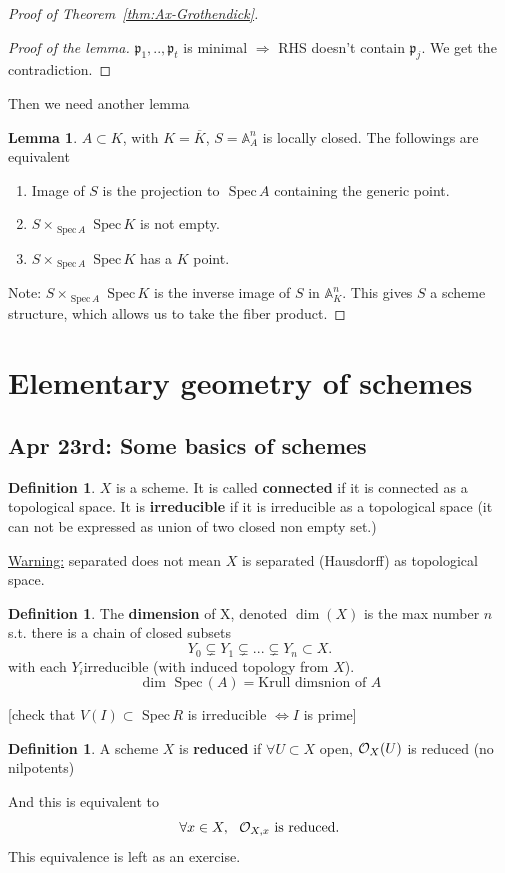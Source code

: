 \documentclass[11pt]{article}
\theoremstyle{definition}
\newtheorem{lemma}[thm]{Lemma}
\newtheorem{dfn}[thm]{Definition}
\newcommand{\spec}{\text{ Spec}\,}
\newcommand{\affn}{\mathbb A}
\newcommand{\scp}{{\mathfrak p}}
\newcommand{\calo}{{\cal O}}
\newcommand{\Lrta}{\Longrightarrow}
\newcommand{\Llrta}{\Longleftrightarrow}
\begin{document}
\begin{proof}[Proof of Theorem~\ref{thm:Ax-Grothendick}]
\begin{proof}[Proof of the lemma]
$\scp_1,..,\scp_t$ is minimal $\Lrta $ RHS doesn't contain $\scp_j$. We get the contradiction.
\end{proof}

Then we need another lemma
\begin{lemma}


$A\subset K$, with $ K=\overline{K}$, $S=\affn^n_A$ is locally closed. The followings are equivalent
\begin{enumerate}[label=(\arabic*)]
\item Image of $S$ is the projection to $\spec A$ containing the generic point.
\item $S\times_{\spec A}\spec K$ is not empty.
\item $S\times_{\spec A}\spec K$ has a $K$ point. 
\end{enumerate}
\end{lemma}

Note: $S\times_{\spec A}\spec K$ is the inverse image of $S$ in $\affn^n_K$. This gives  $S$ a scheme structure, which allows us to take the fiber product.
\end{proof}
\section{Elementary geometry of schemes}
\subsection{Apr 23rd: Some basics of schemes}
\begin{dfn}
$X$ is a scheme. It is called \textbf{connected} if it is connected as a topological space. It is \textbf{irreducible} if it is irreducible as a topological space (it can not be expressed as union of two closed non empty set.)
\end{dfn}
\underline{Warning:} separated does not mean $X$ is separated (Hausdorff) as topological space.

\begin{dfn}
The \textbf{dimension} of X, denoted $\dim(X)$ is the max number $n$ s.t. there is a chain of closed subsets
$$
Y_0\subsetneq Y_1\subsetneq ...\subsetneq Y_n \subset X.
$$ with each $Y_i$irreducible (with induced topology from $X$).
$$
\dim \spec (A)=\text{Krull dimsnion of $A$}
$$ 
\end{dfn}
[check that $V(I)\subset \spec R$ is irreducible $\Llrta I$ is prime] 

\begin{dfn}
A scheme $X$ is \textbf{reduced} if $\forall U\subset X$ open, $\calo_X(U)$ is reduced (no nilpotents)

And this is equivalent to 
$$
\forall x\in X,\ \  \calo_{X,x} \text{ is reduced.}
$$
This equivalence is left as an exercise.
\end{dfn}
\end{document}
